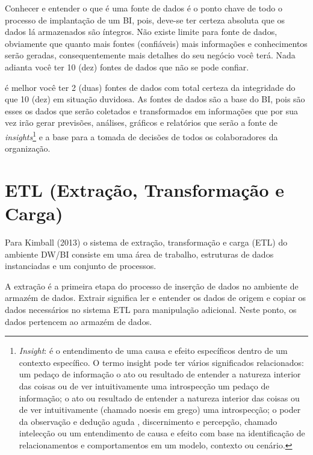 Conhecer e entender o que \'{e} uma fonte de dados \'{e} o ponto chave de todo o processo de implanta\c{c}\~{a}o de um BI, pois, deve-se ter certeza absoluta que os dados l\'{a} armazenados s\~{a}o \'{i}ntegros. N\~{a}o existe limite para fonte de dados, obviamente que quanto mais fontes (confi\'{a}veis) mais informa\c{c}\~{o}es e conhecimentos ser\~{a}o geradas, consequentemente mais detalhes do seu neg\'{o}cio voc\^{e} ter\'{a}. Nada adianta voc\^{e} ter 10 (dez) fontes de dados que n\~{a}o se pode confiar. 

\'{e} melhor voc\^{e} ter 2 (duas) fontes de dados com total certeza da integridade do que 10 (dez) em situa\c{c}\~{a}o duvidosa. As fontes de dados s\~{a}o a base do BI, pois s\~{a}o esses os dados que ser\~{a}o coletados e transformados em informa\c{c}\~{o}es que por sua vez ir\~{a}o gerar previs\~{o}es, an\'{a}lises, gr\'{a}ficos e relat\'{o}rios que ser\~{a}o a fonte de \textit{insights}\footnote{\textit{Insight}: \'{e} o entendimento de uma causa e efeito espec\'{i}ficos dentro de um contexto espec\'{i}fico. O termo insight pode ter v\'{a}rios significados relacionados: um peda\c{c}o de informa\c{c}\~{a}o o ato ou resultado de entender a natureza interior das coisas ou de ver intuitivamente uma introspec\c{c}\~{a}o um peda\c{c}o de informa\c{c}\~{a}o; o ato ou resultado de entender a natureza interior das coisas ou de ver intuitivamente (chamado noesis em grego) uma introspec\c{c}\~{a}o; o poder da observa\c{c}\~{a}o e dedu\c{c}\~{a}o aguda , discernimento e percep\c{c}\~{a}o, chamado intelec\c{c}\~{a}o ou um entendimento de causa e efeito com base na identifica\c{c}\~{a}o de relacionamentos e comportamentos em um modelo, contexto ou cen\'{a}rio.} e a base para a tomada de decis\~{o}es de todos os colaboradores da organiza\c{c}\~{a}o.

\section{ETL (Extra\c{c}\~{a}o, Transforma\c{c}\~{a}o e Carga)}

Para Kimball (2013) o sistema de extra\c{c}\~{a}o, transforma\c{c}\~{a}o e carga (ETL) do ambiente DW/BI consiste em uma \'{a}rea de trabalho, estruturas de dados instanciadas e um conjunto de processos.

A extra\c{c}\~{a}o \'{e} a primeira etapa do processo de inser\c{c}\~{a}o de dados no ambiente de armaz\'{e}m de dados. Extrair significa ler e entender os dados de origem e copiar os dados necess\'{a}rios no sistema ETL para manipula\c{c}\~{a}o adicional. Neste ponto, os dados pertencem ao armaz\'{e}m de dados.

